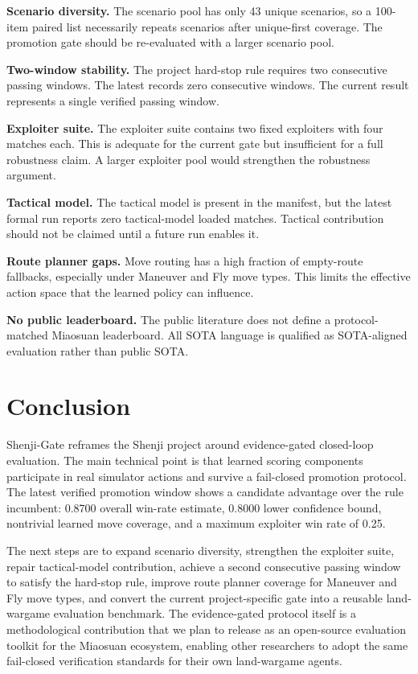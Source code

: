 \documentclass{article}
\newcommand{\method}{Shenji-Gate}
\begin{document}
\textbf{Scenario diversity.} The scenario pool has only 43 unique scenarios, so a 100-item paired list necessarily repeats scenarios after unique-first coverage. The promotion gate should be re-evaluated with a larger scenario pool.

\textbf{Two-window stability.} The project hard-stop rule requires two consecutive passing windows. The latest  records zero consecutive windows. The current result represents a single verified passing window.

\textbf{Exploiter suite.} The exploiter suite contains two fixed exploiters with four matches each. This is adequate for the current gate but insufficient for a full robustness claim. A larger exploiter pool would strengthen the robustness argument.

\textbf{Tactical model.} The tactical model is present in the manifest, but the latest formal run reports zero tactical-model loaded matches. Tactical contribution should not be claimed until a future run enables it.

\textbf{Route planner gaps.} Move routing has a high fraction of empty-route fallbacks, especially under Maneuver and Fly move types. This limits the effective action space that the learned policy can influence.

\textbf{No public leaderboard.} The public literature does not define a protocol-matched Miaosuan leaderboard. All SOTA language is qualified as SOTA-aligned evaluation rather than public SOTA.

\section{Conclusion}

\method{} reframes the Shenji project around evidence-gated closed-loop evaluation. The main technical point is that learned scoring components participate in real simulator actions and survive a fail-closed promotion protocol. The latest verified promotion window shows a candidate advantage over the rule incumbent: 0.8700 overall win-rate estimate, 0.8000 lower confidence bound, nontrivial learned move coverage, and a maximum exploiter win rate of 0.25.

The next steps are to expand scenario diversity, strengthen the exploiter suite, repair tactical-model contribution, achieve a second consecutive passing window to satisfy the hard-stop rule, improve route planner coverage for Maneuver and Fly move types, and convert the current project-specific gate into a reusable land-wargame evaluation benchmark. The evidence-gated protocol itself is a methodological contribution that we plan to release as an open-source evaluation toolkit for the Miaosuan ecosystem, enabling other researchers to adopt the same fail-closed verification standards for their own land-wargame agents.
\end{document}

